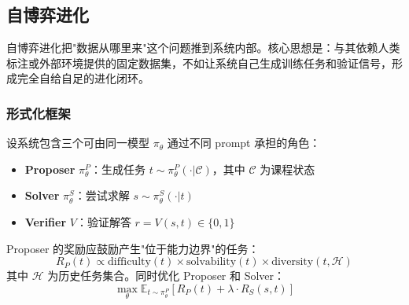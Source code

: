 \subsection{自博弈进化}\label{sec:selfplay}

自博弈进化把"数据从哪里来"这个问题推到系统内部。核心思想是：与其依赖人类标注或外部环境提供的固定数据集，不如让系统自己生成训练任务和验证信号，形成完全自给自足的进化闭环。

\subsubsection{形式化框架}

\begin{definition}[自博弈进化框架]
设系统包含三个可由同一模型 $\pi_\theta$ 通过不同 prompt 承担的角色：
\begin{itemize}
\item \textbf{Proposer} $\pi_\theta^P$：生成任务 $t \sim \pi_\theta^P(\cdot | \mathcal{C})$，其中 $\mathcal{C}$ 为课程状态
\item \textbf{Solver} $\pi_\theta^S$：尝试求解 $s \sim \pi_\theta^S(\cdot | t)$
\item \textbf{Verifier} $V$：验证解答 $r = V(s, t) \in \{0, 1\}$
\end{itemize}
Proposer 的奖励应鼓励产生"位于能力边界"的任务：
\begin{equation}
R_P(t) \propto \text{difficulty}(t) \times \text{solvability}(t) \times \text{diversity}(t, \mathcal{H})
\label{eq:selfplay-reward}
\end{equation}
其中 $\mathcal{H}$ 为历史任务集合。同时优化 Proposer 和 Solver：
\begin{equation}
\max_\theta \mathbb{E}_{t \sim \pi_\theta^P}\left[R_P(t) + \lambda \cdot R_S(s, t)\right]
\label{eq:selfplay-joint}
\end{equation}
\end{definition}

